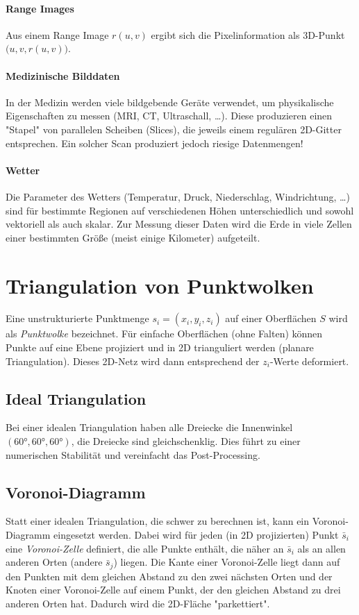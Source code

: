 		\paragraph{Range Images}
			Aus einem Range Image \( r(u, v) \) ergibt sich die Pixelinformation als 3D-Punkt \( \big(u, v, r(u, v)\big) \).

		\paragraph{Medizinische Bilddaten}
			In der Medizin werden viele bildgebende Geräte verwendet, um physikalische Eigenschaften zu messen (MRI, CT, Ultraschall, \dots). Diese produzieren einen "Stapel" von parallelen Scheiben (Slices), die jeweils einem regulären 2D-Gitter entsprechen. Ein solcher Scan produziert jedoch riesige Datenmengen!

		\paragraph{Wetter}
			Die Parameter des Wetters (\zB Temperatur, Druck, Niederschlag, Windrichtung, \dots) sind für bestimmte Regionen auf verschiedenen Höhen unterschiedlich und sowohl vektoriell als auch skalar. Zur Messung dieser Daten wird die Erde in viele Zellen einer bestimmten Größe (meist einige Kilometer) aufgeteilt.

	\section{Triangulation von Punktwolken}
		Eine unstrukturierte Punktmenge \( s_i = (x_i, y_i, z_i) \) auf einer Oberflächen \(S\) wird als \emph{Punktwolke} bezeichnet. Für einfache Oberflächen (ohne Falten) können Punkte auf eine Ebene projiziert und in 2D trianguliert werden (planare Triangulation). Dieses 2D-Netz wird dann entsprechend der \(z_i\)-Werte deformiert.

		\subsection{Ideal Triangulation}
			Bei einer idealen Triangulation haben alle Dreiecke die Innenwinkel \( (\ang{60}, \ang{60}, \ang{60}) \), \dh die Dreiecke sind gleichschenklig. Dies führt zu einer numerischen Stabilität und vereinfacht das Post-Processing.

		\subsection{Voronoi-Diagramm}
			Statt einer idealen Triangulation, die schwer zu berechnen ist, kann ein Voronoi-Diagramm eingesetzt werden. Dabei wird für jeden (in 2D projizierten) Punkt \( \bar{s}_i \) eine \emph{Voronoi-Zelle} definiert, die alle Punkte enthält, die näher an \( \bar{s}_i \) als an allen anderen Orten (andere \( \bar{s}_j \)) liegen. Die Kante einer Voronoi-Zelle liegt dann auf den Punkten mit dem gleichen Abstand zu den zwei nächsten Orten und der Knoten einer Voronoi-Zelle auf einem Punkt, der den gleichen Abstand zu drei anderen Orten hat. Dadurch wird die 2D-Fläche "parkettiert".

